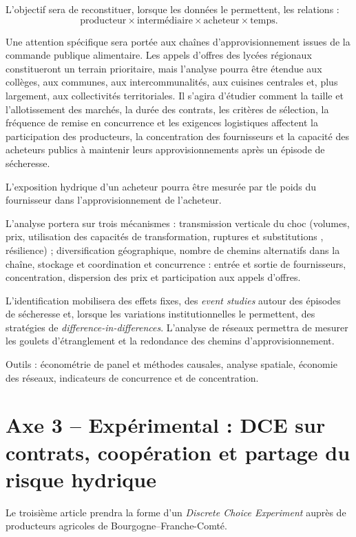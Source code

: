 \documentclass[11pt,a4paper]{article}
\begin{document}
L'objectif sera de reconstituer, lorsque les données le permettent, les relations :
\[
\text{producteur} \times \text{intermédiaire} \times \text{acheteur} \times \text{temps}.
\]

Une attention spécifique sera portée aux chaînes d'approvisionnement issues de la commande publique alimentaire. Les appels d'offres des lycées régionaux constitueront un terrain prioritaire, mais l'analyse pourra être étendue aux collèges, aux communes, aux intercommunalités, aux cuisines centrales et, plus largement, aux collectivités territoriales. Il s'agira d'étudier comment la taille et l'allotissement des marchés, la durée des contrats, les critères de sélection, la fréquence de remise en concurrence et les exigences logistiques affectent la participation des producteurs, la concentration des fournisseurs et la capacité des acheteurs publics à maintenir leurs approvisionnements après un épisode de sécheresse.

L'exposition hydrique d'un acheteur pourra être mesurée par tle poids du fournisseur dans l'approvisionnement de l'acheteur.

L'analyse portera sur trois mécanismes : transmission verticale du choc (volumes, prix, utilisation des capacités de transformation, ruptures et substitutions , résilience) ; diversification géographique, nombre de chemins alternatifs dans la chaîne, stockage et coordination  et concurrence : entrée et sortie de fournisseurs, concentration, dispersion des prix et participation aux appels d'offres.

L'identification mobilisera des effets fixes, des \textit{event studies} autour des épisodes de sécheresse et, lorsque les variations institutionnelles le permettent, des stratégies de \textit{difference-in-differences}. L'analyse de réseaux permettra de mesurer les goulets d'étranglement et la redondance des chemins d'approvisionnement.

Outils : économétrie de panel et méthodes causales, analyse spatiale, économie des réseaux, indicateurs de concurrence et de concentration.

\section{Axe 3 -- Expérimental : DCE sur contrats, coopération et partage du risque hydrique}

Le troisième article prendra la forme d'un \textit{Discrete Choice Experiment} auprès de producteurs agricoles de Bourgogne--Franche-Comté.
\end{document}
